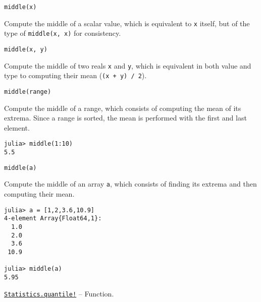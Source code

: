 \begin{adjustwidth}{2em}{0pt}


\begin{verbatim}
middle(x)
\end{verbatim}

Compute the middle of a scalar value, which is equivalent to \texttt{x} itself, but of the type of \texttt{middle(x, x)} for consistency.




\begin{lstlisting}
middle(x, y)
\end{lstlisting}

Compute the middle of two reals \texttt{x} and \texttt{y}, which is equivalent in both value and type to computing their mean (\texttt{(x + y) / 2}).




\begin{lstlisting}
middle(range)
\end{lstlisting}

Compute the middle of a range, which consists of computing the mean of its extrema. Since a range is sorted, the mean is performed with the first and last element.


\begin{verbatim}
julia> middle(1:10)
5.5
\end{verbatim}




\begin{lstlisting}
middle(a)
\end{lstlisting}

Compute the middle of an array \texttt{a}, which consists of finding its extrema and then computing their mean.


\begin{verbatim}
julia> a = [1,2,3.6,10.9]
4-element Array{Float64,1}:
  1.0
  2.0
  3.6
 10.9

julia> middle(a)
5.95
\end{verbatim}



\end{adjustwidth}
\hypertarget{14611219682884062063}{} 
\hyperlink{14611219682884062063}{\texttt{Statistics.quantile!}}  -- {Function.}


